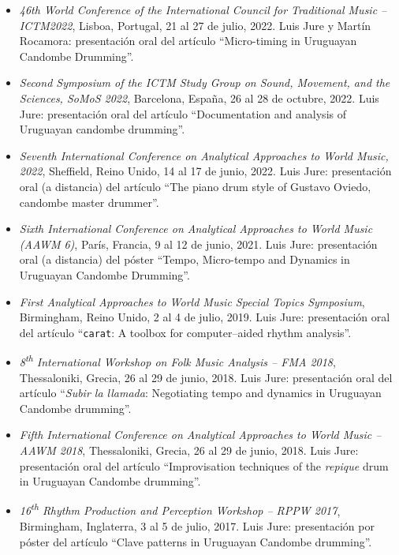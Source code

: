 
\begin{itemize}

\item[] 	%
\emph{46th World Conference of the International Council for Traditional Music -- ICTM2022},
Lisboa, Portugal, 21 al 27 de julio, 2022.
Luis Jure y Martín Rocamora: presentación oral del artículo
``Micro-timing in Uruguayan Candombe Drumming''.

\item[] 	%
\emph{Second Symposium of the ICTM Study Group on Sound, Movement, and the Sciences, SoMoS 2022},
Barcelona, España, 26 al 28 de octubre, 2022.
Luis Jure: presentación oral del artículo
``Documentation and analysis of Uruguayan candombe drumming''.

\item[] 	%
\emph{Seventh International Conference on Analytical Approaches to World Music, 2022},
Sheffield, Reino Unido, 14 al 17 de junio, 2022.
Luis Jure: presentación oral (a distancia) del artículo
``The piano drum style of Gustavo Oviedo, candombe master drummer''.

\item[] 	%
\emph{Sixth International Conference on Analytical Approaches to World Music (AAWM 6)},
París, Francia, 9 al 12 de junio, 2021.
Luis Jure: presentación oral (a distancia) del póster
``Tempo, Micro-tempo and Dynamics in Uruguayan Candombe Drumming''.

\item[]	%
\emph{First Analytical Approaches to World Music Special Topics Symposium},
Birmingham, Reino Unido, 2 al 4 de julio, 2019.
Luis Jure: presentación oral del artículo
``\texttt{carat}: A toolbox for computer--aided rhythm analysis''.

\item[]	%
\emph{8\textsuperscript{th} International Workshop on
Folk Music Analysis -- FMA 2018},
Thessaloniki, Grecia, 26 al 29 de junio, 2018.
Luis Jure: presentación oral del artículo ``\emph{Subir la llamada}:
Negotiating tempo and dynamics in Uruguayan Candombe drumming''.

\item[]	%
\emph{Fifth International Conference on Analytical Approaches
to World Music -- AAWM 2018},
Thessaloniki, Grecia, 26 al 29 de junio, 2018.
Luis Jure: presentación oral del artículo ``Improvisation techniques of the
\emph{repique} drum in Uruguayan Candombe drumming''.

\item[] 	%
\emph{16\textsuperscript{th} Rhythm Production and Perception Workshop -- RPPW 2017},
Birmingham, Inglaterra, 3 al 5 de julio, 2017.
Luis Jure: presentación por póster del artículo ``Clave patterns in Uruguayan Candombe drumming''.


\end{itemize}
